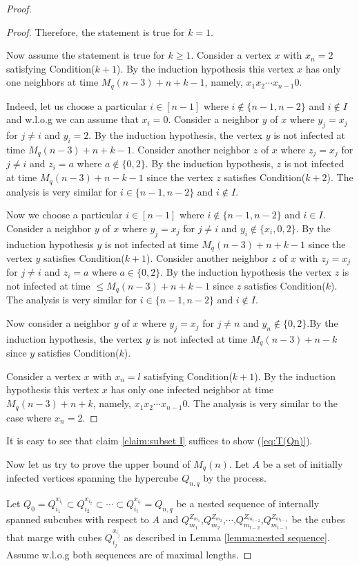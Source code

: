 \documentclass[10pt,a4paper]{amsart}
\renewcommand{\geq}{\geqslant}
\renewcommand{\leq}{\leqslant}
\begin{document}
\begin{proof}
\begin{proof}
Therefore, the statement is true for $k=1$.

Now assume the statement is true for $k \geq 1$. Consider a vertex $x$ with $x_n=2$ satisfying Condition($k+1$). By the induction hypothesis this vertex $x$ has only one neighbors at time $M_q(n-3)+n+k-1$, namely, $x_1x_2\cdots x_{n-1}0$. 

Indeed, let us choose a particular $i \in [n-1]$ where $i \notin \{n-1,n-2\}$ and $i \notin I$ and w.l.o.g we can assume that $x_i=0$. Consider a neighbor $y$ of $x$ where $y_j=x_j$ for $j \neq i$ and $y_i=2$. By the induction hypothesis, the vertex $y$ is not infected at time $M_q(n-3)+n+k-1$. Consider another neighbor $z$ of $x$ where $z_j=x_j$ for $j \neq i$ and $z_i=a$ where $a \notin \{0,2\}$. By the induction hypothesis, $z$ is not infected at time $M_q(n-3)+n-k-1$ since the vertex $z$ satisfies Condition($k+2$). The analysis is very similar for $i \in \{n-1,n-2\}$ and $i \notin I$.  

Now we choose a particular $i \in [n-1]$ where $i \notin \{n-1,n-2\}$ and $i \in I$. Consider a neighbor $y$ of $x$ where $y_j=x_j$ for $j \neq i$ and $y_i \notin \{x_i,0,2\}$. By the induction hypothesis $y$ is not infected at time $M_q(n-3)+n+k-1$ since the vertex $y$ satisfies Condition($k+1$). Consider another neighbor $z$ of $x$ with $z_j=x_j$ for $j \neq i$ and $z_i=a$ where $a \in \{0,2\}$. By the induction hypothesis the vertex $z$ is not infected at time $\leq M_q(n-3)+n+k-1$ since $z$ satisfies Condition($k$). The analysis is very similar for $i \in \{n-1,n-2\}$ and $i \notin I$.

Now consider a neighbor $y$ of $x$ where $y_j=x_j$ for $j \neq n$ and $y_n \notin \{0,2\}$.By the induction hypothesis, the vertex $y$ is not infected at time $M_q(n-3)+n-k$ since $y$ satisfies Condition($k$). 

Consider a vertex $x$ with $x_n=l$ satisfying Condition($k+1$). By the induction hypothesis this vertex $x$ has only one infected neighbor at time $M_q(n-3)+n+k$, namely, $x_1x_2\cdots x_{n-1}0$. The analysis is very similar to the case where $x_n=2$. 
\end{proof}
It is easy to see that claim \ref{claim:subset I} suffices to show (\ref{eq:T(Qn)}).

\vspace{5mm}
Now let us try to prove the upper bound of $M_{q}(n)$. Let $A$ be a set of initially infected vertices spanning the hypercube $Q_{n,q}$ by the process. 

Let  $Q_0=Q_{i_1}^{x_{i_1}} \subset Q_{i_2}^{x_{i_2}} \subset \cdots \subset Q_{i_t}^{x_{i_t}}=Q_{n,q}$ be a nested sequence of internally spanned subcubes with respect to $A$ and $Q_{m_1}^{Z_{m_1}}$,$Q_{m_2}^{Z_{m_2}}$,$\cdots$,$Q_{m_{t-2}}^{Z_{m_{t-2}}}$,$Q_{m_{t-1}}^{Z_{m_{t-1}}}$ be the cubes that marge with cubes $Q_{i_j}^{x_{i_j}}$ as described in Lemma \ref{lemma:nested sequence}. Assume w.l.o.g both sequences are of maximal lengths. 


\end{proof}
\end{document}
